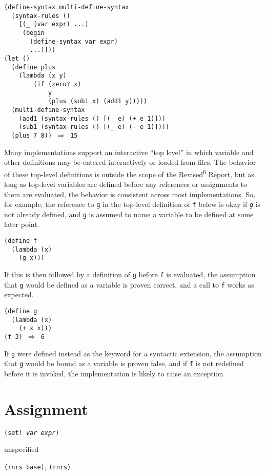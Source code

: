 \begin{alltt}
(define-syntax multi-define-syntax
  (syntax-rules ()
    [(\_{} (var expr) ...)
     (begin
       (define-syntax var expr)
       ...)]))
(let ()
  (define plus
    (lambda (x y)
        (if (zero? x)
            y
            (plus (sub1 x) (add1 y)))))
  (multi-define-syntax
    (add1 (syntax-rules () [(\_{} e) (+ e 1)]))
    (sub1 (syntax-rules () [(\_{} e) (- e 1)])))
  (plus 7 8)) \(\Rightarrow\) 15
\end{alltt}


\label{binding_s27}Many implementations support an interactive ``top level'' in which variable
and other definitions may be entered interactively or loaded from files.
The behavior of these top-level definitions is outside the scope of the
Revised\textsuperscript{6} Report, but as long as top-level variables are defined before
any references or assignments to them are evaluated, the behavior is
consistent across most implementations.
So, for example, the reference to \texttt{g} in the top-level definition
of \texttt{f} below is okay if \texttt{\textit{g}} is not already defined, and \texttt{g}
is assumed to name a variable to be defined at some later point.


\begin{alltt}
(define f
  (lambda (x)
    (g x)))
\end{alltt}


If this is then followed by a definition of \texttt{g} before \texttt{f} is
evaluated, the assumption that \texttt{g} would be defined as a variable is
proven correct, and a call to \texttt{f} works as expected.


\begin{alltt}
(define g
  (lambda (x)
    (+ x x)))
(f 3) \(\Rightarrow\) 6
\end{alltt}


If \texttt{g} were defined instead as the keyword for a syntactic extension,
the assumption that \texttt{g} would be bound as a variable is
proven false, and if \texttt{f} is not redefined before it is invoked,
the implementation is likely to raise an exception.



\section{\label{binding_g95}\label{binding_h7}Assignment\label{binding_SECTASSIGNMENTS}}


\begin{description}

\label{binding_s28}\item[syntax] \texttt{(set! \textit{var} \textit{expr})}



\item[returns] unspecified


\item[libraries] \texttt{(rnrs base)}, \texttt{(rnrs)}
\end{description}


